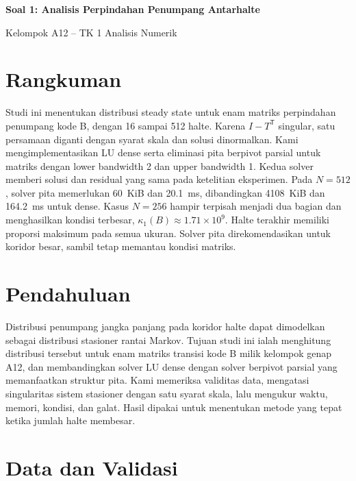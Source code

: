\documentclass[12pt,a4paper]{article}
\numberwithin{equation}{section}
\begin{document}
\begin{center}
{\Large\bfseries Soal 1: Analisis Perpindahan Penumpang Antarhalte}\par\medskip
Kelompok A12 -- TK 1 Analisis Numerik
\end{center}
\section*{Rangkuman}
Studi ini menentukan distribusi steady state untuk enam matriks perpindahan penumpang kode B, dengan 16 sampai 512 halte. Karena $I-T^\mathsf{T}$ singular, satu persamaan diganti dengan syarat skala dan solusi dinormalkan. Kami mengimplementasikan LU dense serta eliminasi pita berpivot parsial untuk matriks dengan lower bandwidth 2 dan upper bandwidth 1. Kedua solver memberi solusi dan residual yang sama pada ketelitian eksperimen. Pada $N=512$, solver pita memerlukan 60~KiB dan 20.1~ms, dibandingkan 4108~KiB dan 164.2~ms untuk dense. Kasus $N=256$ hampir terpisah menjadi dua bagian dan menghasilkan kondisi terbesar, $\kappa_1(B)\approx1.71\times10^9$. Halte terakhir memiliki proporsi maksimum pada semua ukuran. Solver pita direkomendasikan untuk koridor besar, sambil tetap memantau kondisi matriks.
\setcounter{tocdepth}{1}
\tableofcontents
\clearpage


\section{Pendahuluan}
Distribusi penumpang jangka panjang pada koridor halte dapat dimodelkan sebagai distribusi stasioner rantai Markov. Tujuan studi ini ialah menghitung distribusi tersebut untuk enam matriks transisi kode B milik kelompok genap A12, dan membandingkan solver LU dense dengan solver berpivot parsial yang memanfaatkan struktur pita. Kami memeriksa validitas data, mengatasi singularitas sistem stasioner dengan satu syarat skala, lalu mengukur waktu, memori, kondisi, dan galat. Hasil dipakai untuk menentukan metode yang tepat ketika jumlah halte membesar.\par

\section{Data dan Validasi}\label{sec:data}
\end{document}

